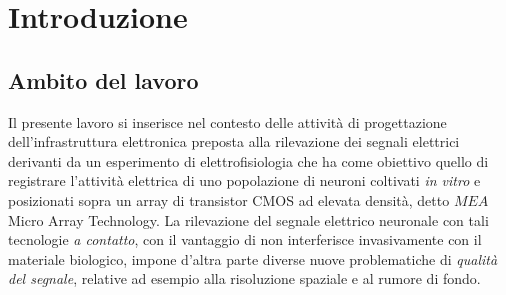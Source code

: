 % 
% 
% 

\tablespagetrue\figurespagetrue %

\allcontents

\mainmatter %

%
%
%
%
%
%
%
% 
% 




\chapter{Introduzione}



\section{Ambito del lavoro}
\label{sez:ambito}

Il presente lavoro si inserisce nel contesto delle attività di progettazione dell'infrastruttura elettronica preposta alla rilevazione dei segnali elettrici derivanti da un esperimento di elettrofisiologia che ha come obiettivo quello di registrare l'attività elettrica di uno popolazione di neuroni coltivati {\it in vitro} e posizionati sopra un array di transistor CMOS ad elevata densità, detto $MEA$ Micro Array Technology. La rilevazione del segnale elettrico neuronale con tali tecnologie {\it a contatto}, con il vantaggio di non interferisce invasivamente con il materiale biologico, impone d'altra parte diverse nuove problematiche di {\it qualità del segnale}, relative ad esempio alla risoluzione spaziale e al rumore di fondo.

